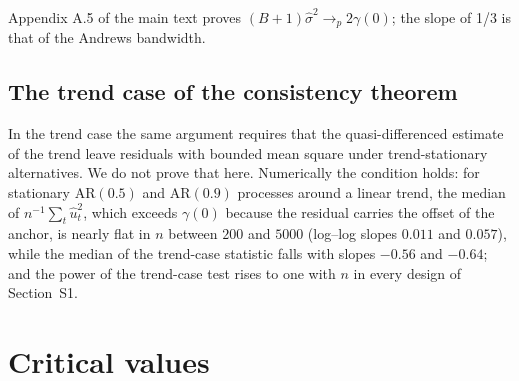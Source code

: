\documentclass[11pt]{article}
\newcommand{\uhat}{\hat{u}}
\newcommand{\RMGLS}{MSB-B}
\begin{document}
Appendix A.5 of the main text proves $(B+1)\hat\sigma^2 \to_p 2\gamma(0)$; the slope of 1/3 is that of the Andrews bandwidth.

\subsection*{The trend case of the consistency theorem}

In the trend case the same argument requires that the quasi-differenced
estimate of the trend leave residuals with bounded mean square under
trend-stationary alternatives. We do not prove that here. Numerically the
condition holds: for stationary AR$(0.5)$ and AR$(0.9)$ processes around a
linear trend, the median of $n^{-1}\sum_t\uhat_t^2$, which exceeds
$\gamma(0)$ because the residual carries the offset of the anchor, is
nearly flat in $n$
between $200$ and $5000$ (log--log slopes $0.011$ and $0.057$), while the
median of the trend-case statistic falls with slopes $-0.56$ and $-0.64$;
and the power of the trend-case test rises to one with $n$ in every design
of Section~S1.

\FloatBarrier
\section{Critical values}\label{supp:s8}

\begin{table}[htbp]
\centering
\caption{Lower-tail critical values of $S_\theta$, $\theta = 0$ (\RMGLS{}).}
\label{tab:critB}
\small
\begin{adjustbox}{max width=\textwidth}

\end{adjustbox}
\end{table}

\begin{table}[htbp]
\centering
\caption{Lower-tail critical values of $S_\theta$, $\theta = 0.02$.}
\label{tab:crit0p02}
\small
\begin{adjustbox}{max width=\textwidth}

\end{adjustbox}
\end{table}

\begin{table}[htbp]
\centering
\caption{Lower-tail critical values of $S_\theta$, $\theta = 0.05$.}
\label{tab:crit0p05}
\small
\begin{adjustbox}{max width=\textwidth}

\end{adjustbox}
\end{table}
\end{document}
